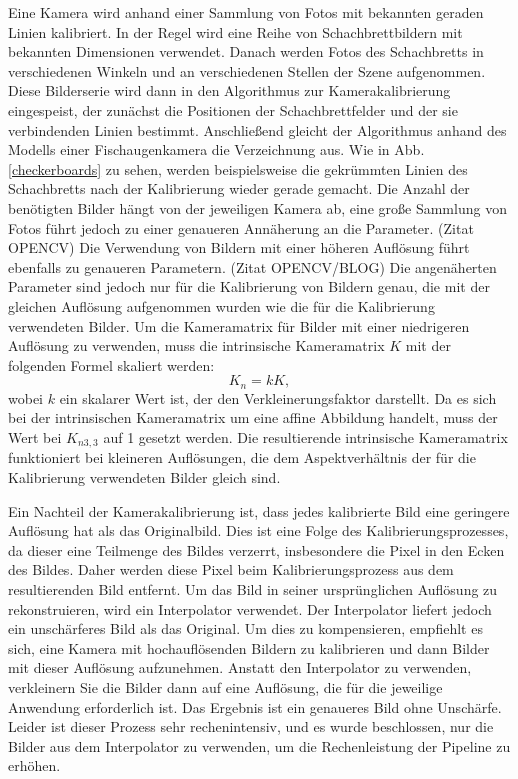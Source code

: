 \documentclass[arbeit=studie,oneside,BCOR=12mm]{ArbeitRST}
\begin{document}
Eine Kamera wird anhand einer Sammlung von Fotos mit bekannten geraden Linien
kalibriert. In der Regel wird eine Reihe von Schachbrettbildern mit bekannten
Dimensionen verwendet. Danach werden Fotos des Schachbretts in verschiedenen
Winkeln und an verschiedenen Stellen der Szene aufgenommen. Diese Bilderserie
wird dann in den Algorithmus zur Kamerakalibrierung eingespeist, der zunächst
die Positionen der Schachbrettfelder und der sie verbindenden Linien bestimmt.
Anschließend gleicht der Algorithmus anhand des Modells einer Fischaugenkamera
die Verzeichnung aus. Wie in Abb. \ref{checkerboards} zu sehen, werden
beispielsweise die gekrümmten Linien des Schachbretts nach der Kalibrierung
wieder gerade gemacht. Die Anzahl der benötigten Bilder hängt von der
jeweiligen Kamera ab, eine große Sammlung von Fotos führt jedoch zu einer
genaueren Annäherung an die Parameter. (Zitat OPENCV) Die Verwendung von
Bildern mit einer höheren Auflösung führt ebenfalls zu genaueren Parametern.
(Zitat OPENCV/BLOG) Die angenäherten Parameter sind jedoch nur für die
Kalibrierung von Bildern genau, die mit der gleichen Auflösung aufgenommen
wurden wie die für die Kalibrierung verwendeten Bilder. Um die Kameramatrix für
Bilder mit einer niedrigeren Auflösung zu verwenden, muss die intrinsische
Kameramatrix $K$ mit der folgenden Formel skaliert werden: 
\begin{equation} 
    K_n = k K, 
\end{equation} 
wobei $k$ ein skalarer Wert ist, der den Verkleinerungsfaktor darstellt. Da es
sich bei der intrinsischen Kameramatrix um eine affine Abbildung handelt, muss
der Wert bei $K_{n3, 3}$ auf 1 gesetzt werden. Die resultierende intrinsische
Kameramatrix funktioniert bei kleineren Auflösungen, die dem Aspektverhältnis
der für die Kalibrierung verwendeten Bilder gleich sind. 

Ein Nachteil der Kamerakalibrierung ist, dass jedes kalibrierte Bild eine
geringere Auflösung hat als das Originalbild. Dies ist eine Folge des
Kalibrierungsprozesses, da dieser eine Teilmenge des Bildes verzerrt,
insbesondere die Pixel in den Ecken des Bildes. Daher werden diese Pixel beim
Kalibrierungsprozess aus dem resultierenden Bild entfernt. Um das Bild in
seiner ursprünglichen Auflösung zu rekonstruieren, wird ein Interpolator
verwendet. Der Interpolator liefert jedoch ein unschärferes Bild als das
Original. Um dies zu kompensieren, empfiehlt es sich, eine Kamera mit
hochauflösenden Bildern zu kalibrieren und dann Bilder mit dieser Auflösung
aufzunehmen. Anstatt den Interpolator zu verwenden, verkleinern Sie die Bilder
dann auf eine Auflösung, die für die jeweilige Anwendung erforderlich ist.  Das
Ergebnis ist ein genaueres Bild ohne Unschärfe. Leider ist dieser Prozess sehr
rechenintensiv, und es wurde beschlossen, nur die Bilder aus dem Interpolator
zu verwenden, um die Rechenleistung der Pipeline zu erhöhen.
\end{document}
